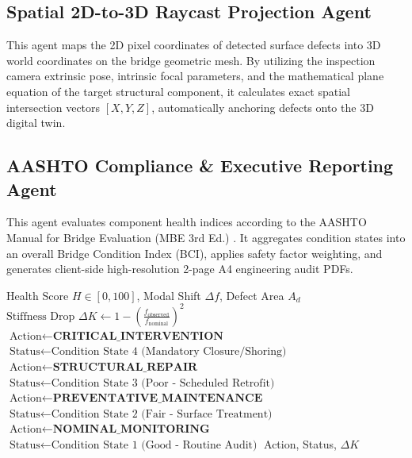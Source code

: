 \documentclass[10pt, conference, letterpaper]{IEEEtran}
\begin{document}
\subsection{Spatial 2D-to-3D Raycast Projection Agent}
This agent maps the 2D pixel coordinates of detected surface defects into 3D world coordinates on the bridge geometric mesh. By utilizing the inspection camera extrinsic pose, intrinsic focal parameters, and the mathematical plane equation of the target structural component, it calculates exact spatial intersection vectors $[X, Y, Z]$, automatically anchoring defects onto the 3D digital twin.

\subsection{AASHTO Compliance \& Executive Reporting Agent}
This agent evaluates component health indices according to the AASHTO Manual for Bridge Evaluation (MBE 3rd Ed.) \cite{aashto2018}. It aggregates condition states into an overall Bridge Condition Index (BCI), applies safety factor weighting, and generates client-side high-resolution 2-page A4 engineering audit PDFs.

\begin{algorithm}[t]
\caption{Dynamic Structural Risk \& AASHTO Decision Policy}
\label{alg:policy}
\begin{algorithmic}[1]
\REQUIRE Health Score $H \in [0, 100]$, Modal Shift $\Delta f$, Defect Area $A_d$
\STATE $\text{Stiffness Drop } \Delta K \leftarrow 1 - \left(\frac{f_{\text{observed}}}{f_{\text{nominal}}}\right)^2$
    \STATE $\text{Action} \leftarrow \textbf{CRITICAL\_INTERVENTION}$
    \STATE $\text{Status} \leftarrow \text{Condition State 4 (Mandatory Closure/Shoring)}$
    \STATE $\text{Action} \leftarrow \textbf{STRUCTURAL\_REPAIR}$
    \STATE $\text{Status} \leftarrow \text{Condition State 3 (Poor - Scheduled Retrofit)}$
    \STATE $\text{Action} \leftarrow \textbf{PREVENTATIVE\_MAINTENANCE}$
    \STATE $\text{Status} \leftarrow \text{Condition State 2 (Fair - Surface Treatment)}$
\ELSE
    \STATE $\text{Action} \leftarrow \textbf{NOMINAL\_MONITORING}$
    \STATE $\text{Status} \leftarrow \text{Condition State 1 (Good - Routine Audit)}$
\ENDIF
\RETURN Action, Status, $\Delta K$
\end{algorithmic}
\end{algorithm}
\end{document}
